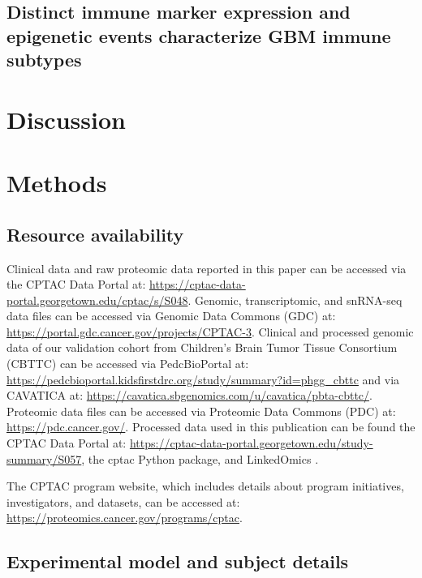 \subsection{Distinct immune marker expression and epigenetic events characterize GBM immune subtypes}



\section{Discussion}



\section{Methods}
\tightlists

\subsection{Resource availability}
Clinical data and raw proteomic data reported in this paper can be accessed via the CPTAC Data Portal at: \url{https://cptac-data-portal.georgetown.edu/cptac/s/S048}. Genomic, transcriptomic, and snRNA-seq data files can be accessed via Genomic Data Commons (GDC) at: \url{https://portal.gdc.cancer.gov/projects/CPTAC-3}. Clinical and processed genomic data of our validation cohort from Children’s Brain Tumor Tissue Consortium (CBTTC) can be accessed via PedcBioPortal at: \url{https://pedcbioportal.kidsfirstdrc.org/study/summary?id=phgg_cbttc} and via CAVATICA at: \url{https://cavatica.sbgenomics.com/u/cavatica/pbta-cbttc/}. Proteomic data files can be accessed via Proteomic Data Commons (PDC) at: \url{https://pdc.cancer.gov/}. Processed data used in this publication can be found the CPTAC Data Portal at: \url{https://cptac-data-portal.georgetown.edu/study-summary/S057}, the cptac Python package, and LinkedOmics \cite{vasaikarsv_zhangb:LinkedOmicsAnalyzing2018}.

The CPTAC program website, which includes details about program initiatives, investigators, and datasets, can be accessed at: \url{https://proteomics.cancer.gov/programs/cptac}.


\subsection{Experimental model and subject details}

